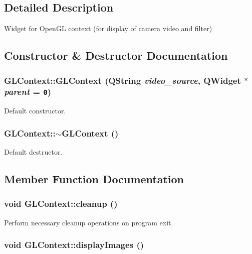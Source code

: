 \subsection{Detailed Description}
Widget for OpenGL context (for display of camera video and filter) 

\subsection{Constructor \& Destructor Documentation}
\hypertarget{classGLContext_57fc1d8a0ec1de5a3445c5aa638e1150}{
\subsubsection[{GLContext}]{\setlength{\rightskip}{0pt plus 5cm}GLContext::GLContext (QString {\em video\_\-source}, \/  QWidget $\ast$ {\em parent} = {\tt 0})}}
\label{classGLContext_57fc1d8a0ec1de5a3445c5aa638e1150}


Default constructor. \hypertarget{classGLContext_ae8b3e070f7f2a9ecf235202f2e330dd}{
\subsubsection[{$\sim$GLContext}]{\setlength{\rightskip}{0pt plus 5cm}GLContext::$\sim$GLContext ()}}
\label{classGLContext_ae8b3e070f7f2a9ecf235202f2e330dd}


Default destructor. 

\subsection{Member Function Documentation}
\hypertarget{classGLContext_df4f504b82483546d470d8361426317b}{
\subsubsection[{cleanup}]{\setlength{\rightskip}{0pt plus 5cm}void GLContext::cleanup ()}}
\label{classGLContext_df4f504b82483546d470d8361426317b}


Perform necessary cleanup operations on program exit. \hypertarget{classGLContext_bc98d2bce284ff629e71a70d43580585}{
\subsubsection[{displayImages}]{\setlength{\rightskip}{0pt plus 5cm}void GLContext::displayImages ()}}
\label{classGLContext_bc98d2bce284ff629e71a70d43580585}


